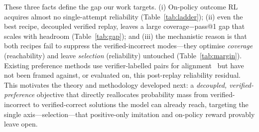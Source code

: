 These three facts define the gap our work targets. (i) On-policy outcome RL
acquires almost no single-attempt reliability (Table~\ref{tab:ladder}); (ii) even
the best recipe, decoupled verified replay, leaves a large coverage$-$pass@1 gap
that scales with headroom (Table~\ref{tab:gap}); and (iii) the mechanistic reason
is that both recipes fail to suppress the verified-incorrect modes---they optimise
\emph{coverage} (reachability) and leave \emph{selection} (reliability) untouched
(Table~\ref{tab:margin}). Existing preference methods use verifier-labelled pairs
for alignment~\cite{rafailov2023dpo,hosseini2024vstar,yuan2024selfreward} but have
not been framed against, or evaluated on, this post-replay reliability residual.
This motivates the theory and methodology developed next: a \emph{decoupled,
verified-preference} objective that directly reallocates probability mass from
verified-incorrect to verified-correct solutions the model can already reach,
targeting the single axis---selection---that positive-only imitation and
on-policy reward provably leave open.
